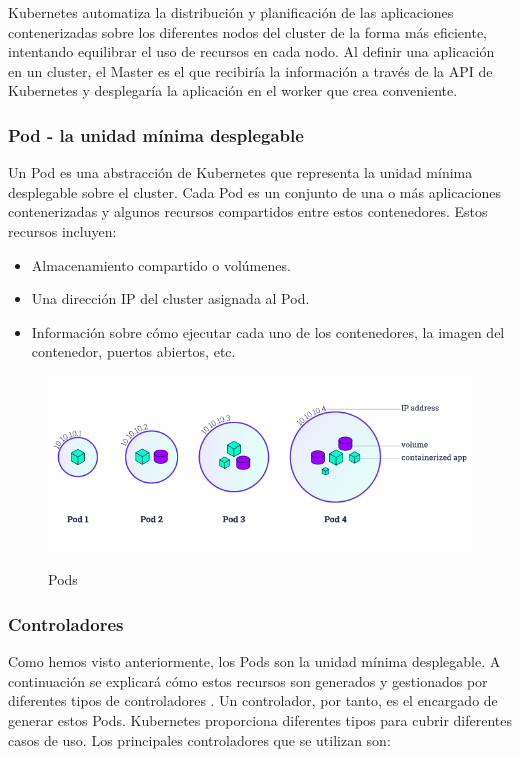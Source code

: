\documentclass[spanish,twoside,12pt,a4paper]{book}
\begin{document}
Kubernetes automatiza la distribución y planificación de las aplicaciones contenerizadas sobre los
diferentes nodos del cluster de la forma más eficiente, intentando equilibrar el uso de recursos en cada
nodo. Al definir una aplicación en un cluster, el Master es el que recibiría la información a través de la
API de Kubernetes y desplegaría la aplicación en el worker que crea conveniente.

\subsubsection{Pod - la unidad mínima desplegable}

Un Pod es una abstracción de Kubernetes que representa la unidad mínima desplegable sobre el cluster. Cada Pod es un conjunto de una o más aplicaciones contenerizadas y algunos recursos compartidos entre estos contenedores. Estos recursos incluyen:
\begin{itemize}
	\item Almacenamiento compartido o volúmenes.
	\item Una dirección IP del cluster asignada al Pod.
	\item Información sobre cómo ejecutar cada uno de los contenedores, la imagen del contenedor, puertos abiertos, etc.
\end{itemize}


\begin{figure}
    \centering
	\includegraphics[scale=0.6]{img/module_03_pods.png}
	\label{fig:Pods}
	\caption{Pods}
\end{figure}

\subsubsection{Controladores}

Como hemos visto anteriormente, los Pods son la unidad mínima desplegable. A continuación se
explicará cómo estos recursos son generados y gestionados por diferentes tipos de controladores .
Un controlador, por tanto, es el encargado de generar estos Pods. Kubernetes proporciona diferentes
tipos para cubrir diferentes casos de uso. Los principales controladores que se utilizan son:
\end{document}
